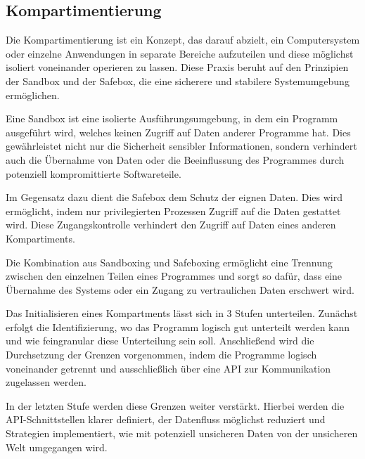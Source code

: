\subsection{Kompartimentierung}

Die Kompartimentierung ist ein Konzept, das darauf abzielt, ein Computersystem oder einzelne Anwendungen in separate Bereiche aufzuteilen und diese möglichst isoliert voneinander operieren zu lassen. Diese Praxis beruht auf den Prinzipien der Sandbox und der Safebox, die eine sicherere und stabilere Systemumgebung ermöglichen. 

Eine Sandbox ist eine isolierte Ausführungsumgebung, in dem ein Programm ausgeführt wird, welches keinen Zugriff auf Daten anderer Programme hat. Dies gewährleistet nicht nur die Sicherheit sensibler Informationen, sondern verhindert auch die Übernahme von Daten oder die Beeinflussung des Programmes durch potenziell kompromittierte Softwareteile.

Im Gegensatz dazu dient die Safebox dem Schutz der eignen Daten. Dies wird ermöglicht, indem nur privilegierten Prozessen Zugriff auf die Daten gestattet wird. Diese Zugangskontrolle verhindert den Zugriff auf Daten eines anderen Kompartiments. 

Die Kombination aus Sandboxing und Safeboxing ermöglicht eine Trennung zwischen den einzelnen Teilen eines Programmes und sorgt so dafür, dass eine Übernahme des Systems oder ein Zugang zu vertraulichen Daten erschwert wird.

Das Initialisieren eines Kompartments lässt sich in 3 Stufen unterteilen. Zunächst erfolgt die Identifizierung, wo das Programm logisch gut unterteilt werden kann und wie feingranular diese Unterteilung sein soll. Anschließend wird die Durchsetzung der Grenzen vorgenommen, indem die Programme logisch voneinander getrennt und ausschließlich über eine API zur Kommunikation zugelassen werden. 

In der letzten Stufe werden diese Grenzen weiter verstärkt. Hierbei werden die API-Schnittstellen klarer definiert, der Datenfluss möglichst reduziert und Strategien implementiert, wie mit potenziell unsicheren Daten von der unsicheren Welt umgegangen wird.